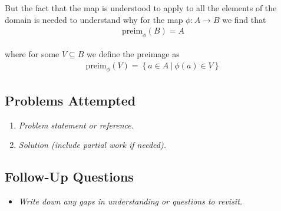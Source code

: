 But the fact that the map is understood to apply to all the elements of the domain is needed to understand why for the map \(\phi : A \to B\) we find that \begin{align*}
    \text{preim}_{\phi}(B) = A 
\end{align*} 

where for some \(V \subseteq B\) we define the preimage as \begin{align*}
    \text{preim}_{\phi}(V) = \left\{ a \in A\ |\ \phi (a) \in V \right\}  
\end{align*} 

\subsection*{Problems Attempted}
\begin{enumerate}
    \item \textit{Problem statement or reference.}
    \item \textit{Solution (include partial work if needed).}
\end{enumerate}

\subsection*{Follow-Up Questions}
\begin{itemize}
    \item \textit{Write down any gaps in understanding or questions to revisit.}
\end{itemize}
